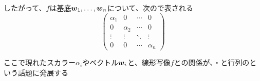\documentclass[../../../topic_linear-algebra]{subfiles}
\begin{document}
したがって、$f$は基底$\vb*{w}_1, \ldots, \vb*{w}_n$について、次ので表される
\begin{equation*}
  \begin{pmatrix}
    \alpha_1 & 0        & \cdots & 0        \\
    0        & \alpha_2 & \cdots & 0        \\
    \vdots   & \vdots   & \ddots & \vdots   \\
    0        & 0        & \cdots & \alpha_n
  \end{pmatrix}
\end{equation*}

ここで現れたスカラー$\alpha_i$やベクトル$\vb*{w}_i$と、線形写像$f$との関係が、・と行列のという話題に発展する
\end{document}
